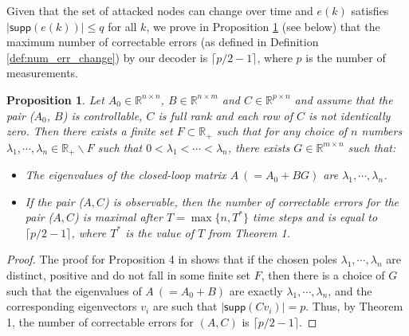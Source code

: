 \documentclass[12pt, conference, a4paper, twoside]{IEEEconf_mod}
\newtheorem{prop}{\bf{Proposition}}
\begin{document}
Given that the set of attacked nodes can change over time and $e(k)$ satisfies $\lvert \textsf{supp} (e(k)) \rvert \le q$ for all $k$, we prove in Proposition \ref{prop:maximum} (see below) that the maximum number of correctable errors (as defined in Definition \ref{def:num_err_change}) by our decoder is $\lceil p/2-1 \rceil$, where $p$ is the number of measurements. 
\begin{prop}\label{prop:maximum} 
Let $A_0 \in \mathbb{R}^{n \times n}$, $B \in \mathbb{R}^{n \times m}$ and $C \in \mathbb{R}^{p \times n}$ and assume that the pair ($A_0$, $B$) is controllable, $C$ is full rank and each row of $C$ is not identically zero. Then there exists a finite set $F \subset \mathbb{R}_+$ such that for any choice of $n$ numbers $\lambda_1, \cdots, \lambda_n \in \mathbb{R}_+ \backslash F$ such that $0<\lambda_1< \cdots < \lambda_n$, there exists $G \in \mathbb{R}^{m \times n}$ such that:
\begin{itemize}
\item
The eigenvalues of the closed-loop matrix $A~(= A_0+BG)$ are $\lambda_1, \cdots, \lambda_n$.
\item
If the pair ($A, C$) is observable, then the number of correctable errors for the pair ($A, C$) is maximal after $T= \max\{n, T^*\}$ time steps and is equal to $\lceil p/2-1 \rceil$, where $T^*$ is the value of $T$ from Theorem 1. 
\end{itemize}
\end{prop}
\begin{proof}
The proof for Proposition 4 in \cite{Fawzi2014} shows that if the chosen poles $\lambda_1, \cdots, \lambda_n$ are distinct, positive and do not fall in some finite set $F$, then there is a choice of $G$ such that the eigenvalues of $A~(=A_0+B)$ are exactly $\lambda_1, \cdots, \lambda_n$, and the corresponding eigenvectors $v_i$ are such that $\lvert \textsf{supp} (C v_i) \rvert = p$. Thus, by Theorem 1, the number of correctable errors for $(A,C)$ is $\lceil p/2-1 \rceil$.
\end{proof}
\end{document}
